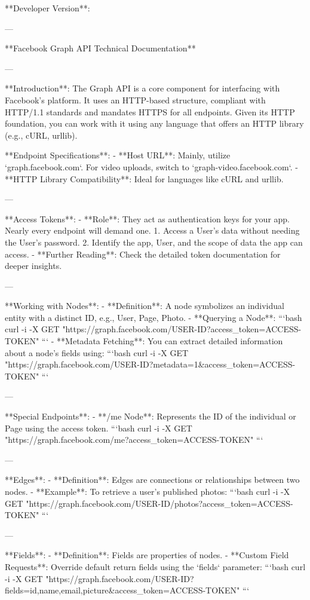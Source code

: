 **Developer Version**:

---

**Facebook Graph API Technical Documentation** 

---

**Introduction**:  
The Graph API is a core component for interfacing with Facebook's platform. It uses an HTTP-based structure, compliant with HTTP/1.1 standards and mandates HTTPS for all endpoints. Given its HTTP foundation, you can work with it using any language that offers an HTTP library (e.g., cURL, urllib).

**Endpoint Specifications**:
- **Host URL**: Mainly, utilize `graph.facebook.com`. For video uploads, switch to `graph-video.facebook.com`.
- **HTTP Library Compatibility**: Ideal for languages like cURL and urllib. 

---

**Access Tokens**:
- **Role**: They act as authentication keys for your app. Nearly every endpoint will demand one.
  1. Access a User's data without needing the User's password.
  2. Identify the app, User, and the scope of data the app can access.
- **Further Reading**: Check the detailed token documentation for deeper insights.

---

**Working with Nodes**:
- **Definition**: A node symbolizes an individual entity with a distinct ID, e.g., User, Page, Photo.
- **Querying a Node**:  
  ```bash
  curl -i -X GET "https://graph.facebook.com/USER-ID?access_token=ACCESS-TOKEN"
  ```
- **Metadata Fetching**: You can extract detailed information about a node's fields using:
  ```bash
  curl -i -X GET "https://graph.facebook.com/USER-ID?metadata=1&access_token=ACCESS-TOKEN"
  ```

---

**Special Endpoints**:
- **/me Node**: Represents the ID of the individual or Page using the access token.
  ```bash
  curl -i -X GET "https://graph.facebook.com/me?access_token=ACCESS-TOKEN"
  ```

---

**Edges**:
- **Definition**: Edges are connections or relationships between two nodes.
- **Example**: To retrieve a user's published photos:
  ```bash
  curl -i -X GET "https://graph.facebook.com/USER-ID/photos?access_token=ACCESS-TOKEN"
  ```

---

**Fields**:
- **Definition**: Fields are properties of nodes.
- **Custom Field Requests**: Override default return fields using the `fields` parameter:
  ```bash
  curl -i -X GET "https://graph.facebook.com/USER-ID?fields=id,name,email,picture&access_token=ACCESS-TOKEN"
  ```

